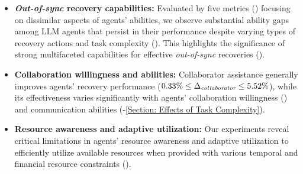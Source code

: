 \begin{itemize}[noitemsep,topsep=0pt,parsep=2pt,partopsep=0pt,leftmargin=*]
\vspace{-5pt}

\item \textbf{\textit{Out-of-sync} recovery capabilities:} Evaluated by five metrics () focusing on dissimilar aspects of agents' abilities, we observe substantial ability gaps among LLM agents that persist in their performance despite varying types of recovery actions and task complexity ().
%
%
This highlights the significance of strong multifaceted capabilities for effective \textit{out-of-sync} recoveries ().

\item \textbf{Collaboration willingness and abilities:} Collaborator assistance generally improves agents' recovery performance ($0.33\% \leq \Delta_{\textit{\text{collaborator}}} \leq 5.52\%$), while its effectiveness varies significantly with agents’ collaboration willingness () and communication abilities (-\ref{Section: Effects of Task Complexity}).

\item \textbf{Resource awareness and adaptive utilization:} Our experiments reveal critical limitations in agents' resource awareness and adaptive utilization to efficiently utilize available resources when provided with various temporal and financial resource constraints ().


\end{itemize}
